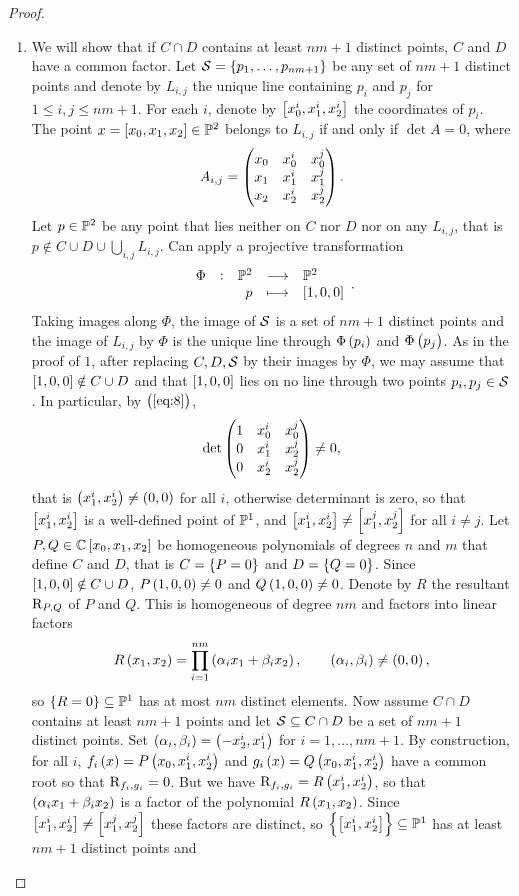 \begin{proof}
\begin{enumerate}

\item We will show that if $ C \cap D $ contains at least $ nm + 1 $ distinct points, $ C $ and $ D $ have a common factor. Let $ \SSS = \cbr{p_1, \dots, p_{nm + 1}} $ be any set of $ nm + 1 $ distinct points and denote by $ L_{i, j} $ the unique line containing $ p_i $ and $ p_j $ for $ 1 \le i, j \le nm + 1 $. For each $ i $, denote by $ \sbr{x_0^i, x_1^i, x_2^i} $ the coordinates of $ p_i $. The point $ x = \sbr{x_0, x_1, x_2} \in \PP^2 $ belongs to $ L_{i, j} $ if and only if $ \det A = 0 $, where
\begin{equation}
\label{eq:8}
A_{i, j} = \begin{pmatrix} x_0 & x_0^i & x_0^j \\ x_1 & x_1^i & x_1^j \\ x_2 & x_2^i & x_2^j \end{pmatrix}.
\end{equation}
Let $ p \in \mathbb{P}^2 $ be any point that lies neither on $ C $ nor $ D $ nor on any $ L_{i, j} $, that is $ p \notin C \cup D \cup \bigcup_{i, j} L_{i, j} $. Can apply a projective transformation
$$ \function[\Phi]{\PP^2}{\PP^2}{p}{\sbr{1, 0, 0}}. $$
Taking images along $ \Phi $, the image of $ \mathcal{S} $ is a set of $ nm + 1 $ distinct points and the image of $ L_{i, j} $ by $ \Phi $ is the unique line through $ \Phi\br{p_i} $ and $ \Phi\br{p_j} $. As in the proof of $ 1 $, after replacing $ C, D, \mathcal{S} $ by their images by $ \Phi $, we may assume that $ \sbr{1, 0, 0} \notin C \cup D $ and that $ \sbr{1, 0, 0} $ lies on no line through two points $ p_i, p_j \in \mathcal{S} $. In particular, by $ \br{\ref{eq:8}} $,
$$ \det \begin{pmatrix} 1 & x_0^i & x_0^j \\ 0 & x_1^i & x_2^j \\ 0 & x_2^i & x_2^j \end{pmatrix} \ne 0, $$
that is $ \br{x_1^i, x_2^i} \ne \br{0, 0} $ for all $ i $, otherwise determinant is zero, so that $ \sbr{x_1^i, x_2^i} $ is a well-defined point of $ \mathbb{P}^1 $, and $ \sbr{x_1^i, x_2^i} \ne \sbr{x_1^j, x_2^j} $ for all $ i \ne j $. Let $ P, Q \in \CC\sbr{x_0, x_1, x_2} $ be homogeneous polynomials of degrees $ n $ and $ m $ that define $ C $ and $ D $, that is $ C = \cbr{P = 0} $ and $ D = \cbr{Q = 0} $. Since $ \sbr{1, 0, 0} \notin C \cup D $, $ P\br{1, 0, 0} \ne 0 $ and $ Q\br{1, 0, 0} \ne 0 $. Denote by $ R $ the resultant $ \mathrm{R}_{P, Q} $ of $ P $ and $ Q $. This is homogeneous of degree $ nm $ and factors into linear factors
$$ R\br{x_1, x_2} = \prod_{i = 1}^{nm}\br{\alpha_ix_1 + \beta_ix_2}, \qquad \br{\alpha_i, \beta_i} \ne \br{0, 0}, $$
so $ \cbr{R = 0} \subseteq \PP^1 $ has at most $ nm $ distinct elements. Now assume $ C \cap D $ contains at least $ nm + 1 $ points and let $ \mathcal{S} \subseteq C \cap D $ be a set of $ nm + 1 $ distinct points. Set $ \br{\alpha_i, \beta_i} = \br{-x_2^i, x_1^i} $ for $ i = 1, \dots, nm + 1 $. By construction, for all $ i $, $ f_i\br{x} = P\br{x_0, x_1^i, x_2^i} $ and $ g_i\br{x} = Q\br{x_0, x_1^i, x_2^i} $ have a common root so that $ \mathrm{R}_{f_i, g_i} = 0 $. But we have $ \R_{f_i, g_i} = R\br{x_1^i, x_2^i} $, so that $ \br{\alpha_ix_1 + \beta_ix_2} $ is a factor of the polynomial $ R\br{x_1, x_2} $. Since $ \sbr{x_1^i, x_2^i} \ne \sbr{x_1^j, x_2^j} $ these factors are distinct, so $ \cbr{\sbr{x_1^i, x_2^i}} \subseteq \PP^1 $ has at least $ nm + 1 $ distinct points and

\end{enumerate}
\end{proof}
